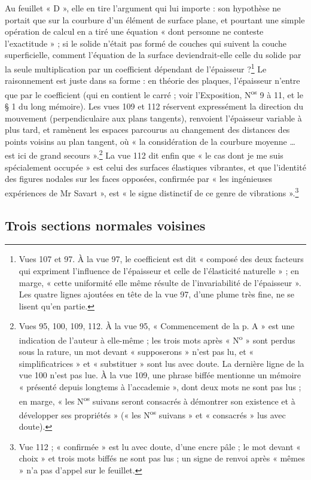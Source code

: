 \documentclass[11pt,a4paper]{article}
\begin{document}
Au feuillet « D », elle en tire l'argument qui lui importe : son hypothèse ne
portait que sur la courbure d'un élément de surface plane, et pourtant une
simple opération de calcul en a tiré une équation « dont personne ne conteste
l'exactitude » ; si le solide n'était pas formé de couches qui suivent la couche
superficielle, comment l'équation de la surface deviendrait-elle celle du solide
par la seule multiplication par un coefficient dépendant de
l'épaisseur ?\footnote{Vues 107 et 97. À la vue 97, le coefficient est dit
« composé des deux facteurs qui expriment l'influence de l'épaisseur et celle de
l'élasticité naturelle » ; en marge, « cette uniformité elle même résulte de
l'invariabilité de l'épaisseur ». Les quatre lignes ajoutées en tête de la vue
97, d'une plume très fine, ne se lisent qu'en partie.} Le raisonnement est
juste dans sa forme : en théorie des plaques, l'épaisseur n'entre que par le
coefficient (qui en contient le carré ; voir l'Exposition, N\textsuperscript{os} 9 à 11, et le § 1 du long mémoire). Les
vues 109 et 112 réservent expressément la direction du mouvement
(perpendiculaire aux plans tangents), renvoient l'épaisseur variable à plus tard,
et ramènent les espaces parcourus au changement des distances des points voisins
au plan tangent, où « la considération de la courbure moyenne … est ici de
grand secours ».\footnote{Vues 95, 100, 109, 112. À la vue 95, « Commencement de
la p. A » est une indication de l'auteur à elle-même ; les trois mots après
« N\textsuperscript{o} » sont perdus sous la rature, un mot devant « supposerons »
n'est pas lu, et « simplificatrices » et « substituer » sont lus avec doute. La dernière ligne de la vue 100 n'est pas lue.
À la vue 109, une phrase biffée mentionne un mémoire « présenté depuis longtems à
l'accademie », dont deux mots ne sont pas lus ; en marge, « les N\textsuperscript{os} suivans
seront consacrés à démontrer son existence et à développer ses propriétés »
(« les N\textsuperscript{os} suivans » et « consacrés » lus avec doute).} La vue 112 dit enfin
que « le cas dont je me suis spécialement occupée » est celui des surfaces
élastiques vibrantes, et que l'identité des figures nodales sur les faces
opposées, confirmée par « les ingénieuses expériences de Mr Savart », est
« le signe distinctif de ce genre de vibrations ».\footnote{Vue 112 ;
« confirmée » est lu avec doute, d'une encre pâle ; le mot devant « choix » et
trois mots biffés ne sont pas lus ; un signe de renvoi après « mêmes » n'a pas
d'appel sur le feuillet.}

\subsection*{Trois sections normales voisines}
\end{document}
